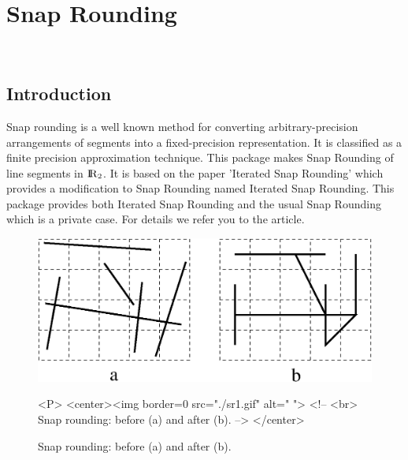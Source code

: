 
\ccParDims


\chapter{Snap Rounding}
\label{chapterSnapRoundibg}
\\
\newcommand{\reals}{{\rm I\!\hspace{-0.025em} R}}
\def\A{{\cal A}}
\def\S{{\cal S}}

\section{Introduction}
Snap rounding is a well known method for converting
arbitrary-precision arrangements of segments into a fixed-precision
representation. It is classified as a finite precision approximation 
technique. This package makes Snap Rounding of line segments in $\reals_2$.
It is based on the paper 'Iterated Snap Rounding' which provides a modification
to Snap Rounding named Iterated Snap Rounding. This package provides both
Iterated Snap Rounding and the usual Snap Rounding which is a private case.
For details we refer you to the article.

\begin{figure}
\begin{center}
\begin{ccTexOnly}
{\centering \resizebox*{0.4\textwidth}{0.15\textheight}%
 {\includegraphics{sr1.ps}}
}
\end{ccTexOnly}
\caption{Snap rounding: before (a) and after (b).\label{fig:sr1}}
\begin{ccHtmlOnly}
<P>
<center><img border=0 src="./sr1.gif" alt=" ">
<!--
<br>
Snap rounding: before (a) and after (b).
-->
</center>
\end{ccHtmlOnly}
\end{center}
\end{figure}

